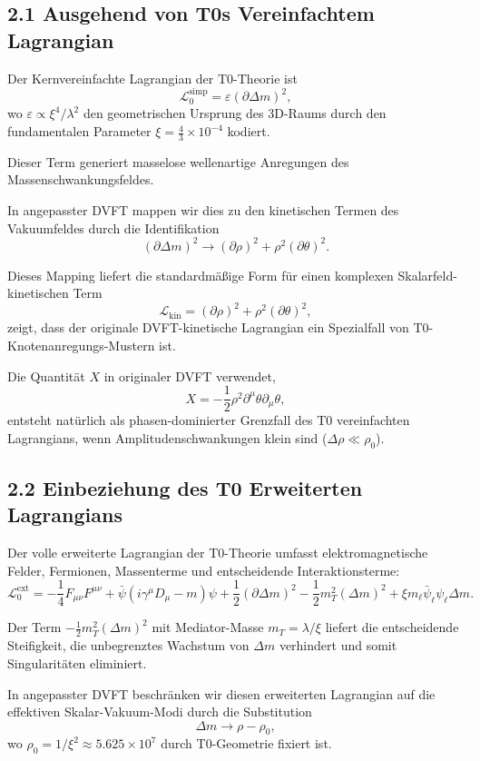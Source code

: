 \documentclass[12pt,a4paper]{article}
\begin{document}
	\subsection{2.1 Ausgehend von T0s Vereinfachtem Lagrangian}
	
	Der Kernvereinfachte Lagrangian der T0-Theorie ist
	\[
	\mathcal{L}_0^{\text{simp}} = \varepsilon (\partial \Delta m)^2,
	\]
	wo $\varepsilon \propto \xi^4 / \lambda^2$ den geometrischen Ursprung des 3D-Raums durch den fundamentalen Parameter $\xi = \frac{4}{3} \times 10^{-4}$ kodiert.
	
	Dieser Term generiert masselose wellenartige Anregungen des Massenschwankungsfeldes.
	
	In angepasster DVFT mappen wir dies zu den kinetischen Termen des Vakuumfeldes durch die Identifikation
	\[
	(\partial \Delta m)^2 \to (\partial \rho)^2 + \rho^2 (\partial \theta)^2.
	\]
	
	Dieses Mapping liefert die standardmäßige Form für einen komplexen Skalarfeld-kinetischen Term
	\[
	\mathcal{L}_{\text{kin}} = (\partial \rho)^2 + \rho^2 (\partial \theta)^2,
	\]
	zeigt, dass der originale DVFT-kinetische Lagrangian ein Spezialfall von T0-Knotenanregungs-Mustern ist.
	
	Die Quantität $X$ in originaler DVFT verwendet,
	\[
	X = -\frac{1}{2} \rho^2 \partial^\mu \theta \partial_\mu \theta,
	\]
	entsteht natürlich als phasen-dominierter Grenzfall des T0 vereinfachten Lagrangians, wenn Amplitudenschwankungen klein sind ($\Delta \rho \ll \rho_0$).
	
	\subsection{2.2 Einbeziehung des T0 Erweiterten Lagrangians}
	
	Der volle erweiterte Lagrangian der T0-Theorie umfasst elektromagnetische Felder, Fermionen, Massenterme und entscheidende Interaktionsterme:
	\[
	\mathcal{L}_0^{\text{ext}} = -\frac{1}{4} F_{\mu\nu}F^{\mu\nu} + \bar{\psi}(i\gamma^\mu D_\mu - m)\psi + \frac{1}{2}(\partial \Delta m)^2 - \frac{1}{2} m_T^2 (\Delta m)^2 + \xi m_\ell \bar{\psi}_\ell \psi_\ell \Delta m.
	\]
	
	Der Term $-\frac{1}{2} m_T^2 (\Delta m)^2$ mit Mediator-Masse $m_T = \lambda / \xi$ liefert die entscheidende Steifigkeit, die unbegrenztes Wachstum von $\Delta m$ verhindert und somit Singularitäten eliminiert.
	
	In angepasster DVFT beschränken wir diesen erweiterten Lagrangian auf die effektiven Skalar-Vakuum-Modi durch die Substitution
	\[
	\Delta m \to \rho - \rho_0,
	\]
	wo $\rho_0 = 1/\xi^2 \approx 5.625 \times 10^7$ durch T0-Geometrie fixiert ist.
	
\end{document}
